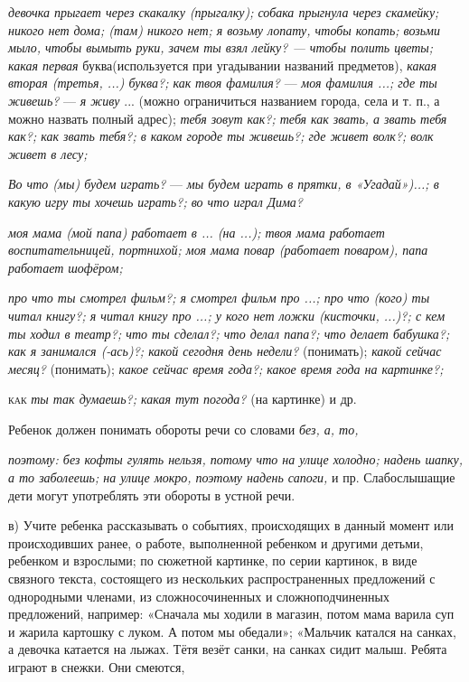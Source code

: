 \documentclass[a5paper]{book}
\renewcommand{\emph}[1]{\textit{#1}}
\begin{document}
\emph{девочка прыгает через скакалку (прыгалку); собака прыгнула через
скамейку; никого нет дома; (там) никого нет; я возьму лопату, чтобы
копать; возьми мыло, чтобы вымыть руки, зачем ты взял лейку? --- чтобы
полить цветы; какая первая} буква(используется при угадывании названий
предметов), \emph{какая вторая (третья, ...) буква?; как} \emph{твоя
фамилия?} --- \emph{моя фамилия ...; где ты живешь?} --- \emph{я живу}
... (можно ограничиться названием города, села и т. п., а можно назвать
полный адрес); \emph{тебя зовут как?; тебя как звать, а звать тебя как?;
как звать тебя?; в каком городе ты живешь?; где живет волк?; волк живет
в лесу;}

\emph{Во что (мы) будем играть?} --- \emph{мы будем играть в прятки, в
«Угадай»)...; в какую игру ты хочешь играть?; во что играл Дима?}

\emph{моя мама (мой папа) работает в ... (на ...); твоя мама работает
воспитательницей, портнихой; моя мама повар (работает поваром), папа
работает шофёром;}

\emph{про что ты смотрел фильм?; я смотрел фильм про ...; про что (кого)
ты читал книгу?; я читал книгу про ...; у кого нет ложки (кисточки,
...)?; с кем ты ходил в театр?; что ты сделал?; что делал папа?; что
делает бабушка?; как я занимался (-ась)?; какой сегодня день недели?}
(понимать); \emph{какой сейчас месяц?} (понимать); \emph{какое сейчас
время года?; какое время года на картинке?;}

\textsc{как} \emph{ты так думаешь?; какая тут погода?} (на картинке) и
др.

Ребенок должен понимать обороты речи со словами \emph{без, а, то,}

\emph{поэтому: без кофты гулять нельзя, потому что на улице холодно;
надень шапку, а то заболеешь; на улице мокро, поэтому надень сапоги,} и
пр. Слабослышащие дети могут употреблять эти обороты в устной речи.

в) Учите ребенка рассказывать о событиях, происходящих в данный момент
или происходивших ранее, о работе, выполненной ребенком и другими
детьми, ребенком и взрослыми; по сюжетной картинке, по серии картинок, в
виде связного текста, состоящего из нескольких распространенных
предложений с однородными членами, из сложносочиненных и
сложноподчиненных предложений, например: «Сначала мы ходили в магазин,
потом мама варила суп и жарила картошку с луком. А потом мы обедали»;
«Мальчик катался на санках, а девочка катается на лыжах. Тётя везёт
санки, на санках сидит малыш. Ребята играют в снежки. Они смеются,
\end{document}
